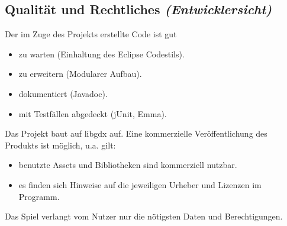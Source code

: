 \subsection{Qualität und Rechtliches \textit{(Entwicklersicht)}}
\begin{requirements}
	 Der im Zuge des Projekts erstellte Code ist gut
		\begin{itemize}
			\item zu warten (Einhaltung des Eclipse Codestils).
			\item zu erweitern (Modularer Aufbau).
			\item dokumentiert (Javadoc).
			\item mit Testfällen abgedeckt (jUnit, Emma).
		\end{itemize}
	 Das Projekt baut auf libgdx auf.
	 Eine kommerzielle Veröffentlichung des Produkts ist möglich, u.a. gilt:
		\begin{itemize}
			\item benutzte Assets und Bibliotheken sind kommerziell nutzbar.
			\item es finden sich Hinweise auf die jeweiligen Urheber und Lizenzen im Programm.
		\end{itemize}
	 Das Spiel verlangt vom Nutzer nur die nötigsten Daten und Berechtigungen.
\end{requirements}
